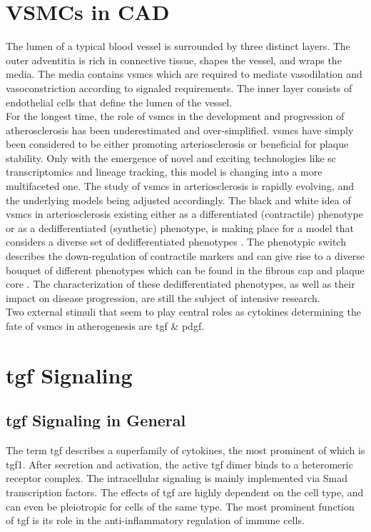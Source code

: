 \section{VSMCs in CAD}
\label{sec:haosms}
The lumen of a typical blood vessel is surrounded by three distinct layers. The outer adventitia is rich in connective tissue, shapes the vessel, and wraps the media. The media contains \acp{vsmc} which are required to mediate vasodilation and vasoconstriction according to signaled requirements. The inner layer consists of endothelial cells that define the lumen of the vessel. \cite{tuckerAnatomyBloodVessels2022a, yapSixShadesVascular2021}\\
For the longest time, the role of \acp{vsmc} in the development and progression of atherosclerosis has been underestimated and over-simplified. \acp{vsmc} have simply been considered to be either promoting arteriosclerosis or beneficial for plaque stability. Only with the emergence of novel and exciting technologies like \ac{sc} transcriptomics and lineage tracking, this model is changing into a more multifaceted one. \cite{liuSmoothMuscleCell2019, grootaertVascularSmoothMuscle2021, yapSixShadesVascular2021} The study of \acp{vsmc} in arteriosclerosis is rapidly evolving, and the underlying models being adjusted accordingly. The black and white idea of \acp{vsmc} in arteriosclerosis existing either as a differentiated (contractile) phenotype or as a dedifferentiated (synthetic) phenotype, is making place for a model that considers a diverse set of dedifferentiated phenotypes \cite{liuSmoothMuscleCell2019, grootaertVascularSmoothMuscle2021, yapSixShadesVascular2021}. The phenotypic switch describes the down-regulation of contractile markers and can give rise to a diverse bouquet of different phenotypes which can be found in the fibrous cap and plaque core \cite{grootaertVascularSmoothMuscle2021}. The characterization of these dedifferentiated phenotypes, as well as their impact on disease progression, are still the subject of intensive research.\\
Two external stimuli that seem to play central roles as cytokines determining the fate of \acp{vsmc} in atherogenesis are \ac{tgf} \& \ac{pdgf}.


\section{\ac{tgf} Signaling}
\label{sec:tgf}

    \subsection{\ac{tgf} Signaling in General}
    \label{subsec:tgf_the_cytokine}
    The term \ac{tgf} describes a superfamily of cytokines, the most prominent of which is \ac{tgf}1. After secretion and activation, the active \ac{tgf} dimer binds to a heteromeric receptor complex. The intracellular signaling is mainly implemented via Smad transcription factors. The effects of \ac{tgf} are highly dependent on the cell type, and can even be pleiotropic for cells of the same type. The most prominent function of \ac{tgf} is its role in the anti-inflammatory regulation of immune cells. \cite{goumansTGFvSignalingControl2018, batlleTransformingGrowthFactorv2019}

